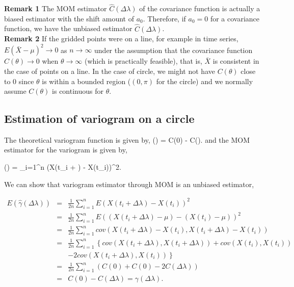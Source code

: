 

{\bf Remark 1} The MOM estimator $\hat{C}(\Delta \lambda)$ of the covariance function is actually a biased estimator with the shift amount of $a_0$. Therefore, if $a_0 = 0$ for a covariance function, we have the unbiased estimator $\hat{C}(\Delta \lambda)$. \\

{\bf Remark 2} If the gridded points were on a line, for example in time series, $E(\bar{X} - \mu)^2 \to 0$ as $n \to \infty$ under the assumption that the covariance function $C(\theta) \to 0$ when $\theta \to \infty$ (which is practically feasible), that is, $\bar{X}$ is consistent in the case of points on a line. In the case of circle, we might not have $C(\theta)$ close to 0 since $\theta$ is within a bounded region ($(0, \pi)$ for the circle) and we normally assume $C(\theta)$ is continuous for $\theta$. \\


\subsection{Estimation of variogram on a circle}

The theoretical variogram function is given by,
\beq
\gamma(\theta) = C(0) - C(\theta).
\eeq
and the MOM estimator for the variogram is given by,

\beq
\hat{\gamma}(\Delta \lambda) =  \sum_{i=1}^n (X(t_i + \Delta \lambda) - X(t_i))^2.
\eeq

We can show that variogram estimator through MOM is an unbiased estimator, 

\begin{eqnarray*}
	E(\hat{\gamma}(\Delta \lambda)) &=& \frac{1}{2n} \sum_{i = 1}^n E(X(t_i + \Delta \lambda) - X(t_i))^2 \\
	&=& \frac{1}{2n} \sum_{i = 1}^n E((X(t_i + \Delta \lambda)-\mu) - (X(t_i) - \mu))^2 \\
	&=& \frac{1}{2n} \sum_{i = 1}^n cov(X(t_i + \Delta \lambda) - X(t_i), X(t_i + \Delta \lambda) - X(t_i)) \\
	&=& \frac{1}{2n} \sum_{i = 1}^n \left\{ cov(X(t_i + \Delta \lambda), X(t_i + \Delta \lambda)) + cov(X(t_i), X(t_i)) \right. \\
	& & \left. - 2cov(X(t_i + \Delta \lambda), X(t_i)) \right\}\\
	&=& \frac{1}{2n} \sum_{i = 1}^n \left( C(0) + C(0) - 2C(\Delta \lambda)\right) \\
	&=& C(0) - C(\Delta \lambda) = \gamma(\Delta \lambda).
\end{eqnarray*}
 
